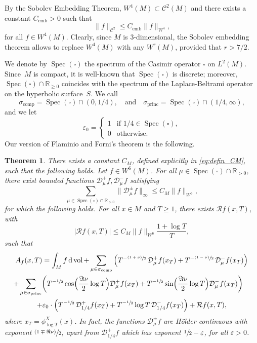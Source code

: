 \documentclass[11pt]{article}
\newcommand{\psfrac}[2]{\sfrac{(#1)}{#2}}
\newcommand \R{\mathbb{R}}
\newcommand*{\diff}{\mathop{}\!\mathrm{d}}
\newcommand{\Dp}[1]{\mathcal{D}_\mu^{+} #1}
\newcommand{\Dm}[1]{\mathcal{D}_\mu^{-} #1}
\newcommand{\Dpm}[1]{\mathcal{D}_\mu^{\pm} #1}
\newcommand{\aver}[1]{A_{#1}(x,T)}
\DeclareMathOperator{\vol}{vol}
\DeclareMathOperator{\emb}{emb}
\DeclareMathOperator{\Spec}{Spec}
\DeclareMathOperator{\comp}{comp}
\DeclareMathOperator{\princ}{princ}
\newtheorem{theorem}{Theorem}
\theoremstyle{definition}
\begin{document}
By the Sobolev Embedding Theorem, $W^4(M) \subset \mathscr{C}^2(M)$ and there exists a constant $C_{\emb}>0$ such that
\[
\|f\|_{\mathscr{C}^2} \leq C_{\emb} \|f\|_{W^4},
\]
for all $f \in W^4(M)$. Clearly, since $M$ is 3-dimensional, the Sobolev embedding theorem allows to replace $W^4(M)$ with any $W^r(M)$, provided that $r > 7/2$.

We denote by $\Spec(\square)$ the spectrum of the Casimir operator $\square$ on $L^2(M)$.
Since~$M$ is compact, it is well-known that $\Spec(\square)$ is discrete; moreover, $\Spec(\square) \cap \R_{\geq 0}$ coincides with the spectrum of the Laplace-Beltrami operator on the hyperbolic surface~$S$. We call
\[
\sigma_{\comp} = \Spec(\square) \cap (0,1/4), \quad\text{and}\quad \sigma_{\princ} = \Spec(\square) \cap (1/4, \infty),
\]
and we let
\[
\varepsilon_0 =
\begin{cases}
1 & \text{if } 1/4 \in \Spec(\square),\\
0 & \text{otherwise}.
\end{cases}
\]
Our version of Flaminio and Forni's theorem is the following.
\begin{theorem}\label{thm:main_FF}
There exists a constant $C_M$, defined explicitly in \eqref{eq:defin_CM}, such that the following holds. Let $f \in W^6(M)$. For all $\mu \in \Spec(\square) \cap \R_{>0}$, there exist bounded functions $\Dp{f}, \Dm{f}$ satisfying
\[
\sum_{\mu \in \Spec(\square) \cap \R_{>0}} \|\Dpm{f}\|_{\infty} \leq C_M \|f \|_{W^6},
\]
for which the following holds. For all $x \in M$ and $T \geq 1$, there exists $\mathcal{R}f(x,T)$, with
\[
|\mathcal{R}f(x,T)|\leq C_M \|f \|_{W^6} \frac{1+ \log T}{T},
\]
such that
\begin{multline*}
\aver{f} = \int_M f \diff \vol + \sum_{\mu \in \sigma_{\comp}} \left(T^{-\psfrac{1+\nu}{2}} \, \Dp{f(x_T) } + T^{-\psfrac{1-\nu}{2}} \, \Dm{ f(x_T)} \right)\\
\shoveright{+ \sum_{\mu \in \sigma_{\princ}}\biggl(T^{-\sfrac{1}{2}} \cos\Bigl(\frac{\Im\nu}{2} \log T \Bigr) \Dp{ f(x_T)} + T^{-\sfrac{1}{2}} \sin\Bigl(\frac{\Im\nu}{2} \log T \Bigr) \Dm{ f(x_T)} \biggr)} \\
+ \varepsilon_0 \cdot \left(T^{-\sfrac{1}{2}} \, \mathcal{D}^{+}_{1/4} f(x_T) + T^{-\sfrac{1}{2}} \log T \, \mathcal{D}^{-}_{1/4} f(x_T) \right) + \mathcal{R}f(x,T),
\end{multline*}
where $x_T= \phi^X_{\log T}(x)$. In fact, the functions $\Dpm{f}$ are \emph{Hölder continuous} with exponent $\psfrac{1 \mp \Re\nu}{2}$, apart from $\mathcal{D}^{+}_{1/4}f$ which has exponent $\sfrac{1}{2}- \varepsilon$, for all $\varepsilon >0$.
\end{theorem}
\end{document}
